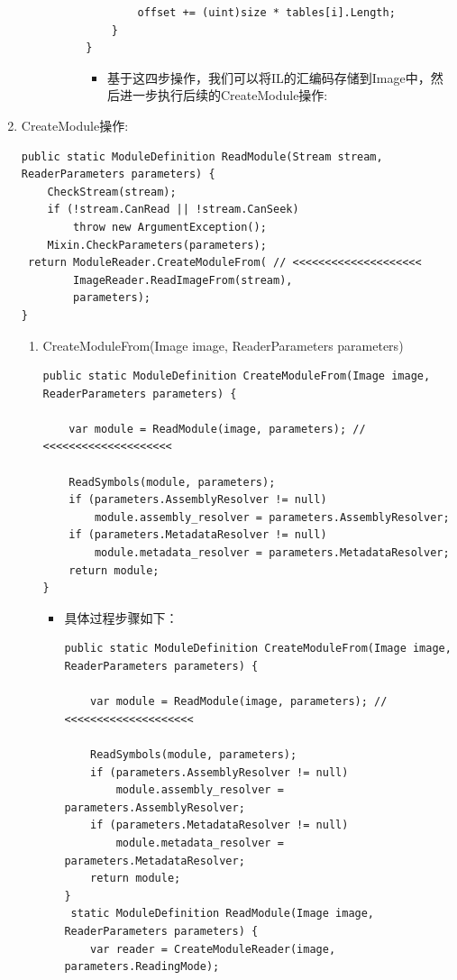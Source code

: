 \documentclass[9pt, b5paper]{article}
\begin{document}
\begin{enumerate}
\begin{enumerate}
\begin{enumerate}
\begin{enumerate}
\begin{verbatim}
        offset += (uint)size * tables[i].Length;
    }
}
\end{verbatim}
\begin{itemize}
\item 基于这四步操作，我们可以将IL的汇编码存储到Image中，然后进一步执行后续的CreateModule操作:
\end{itemize}
\end{enumerate}
\end{enumerate}
\end{enumerate}
\item CreateModule操作:
\label{sec-9-1-3-2}
\begin{verbatim}
public static ModuleDefinition ReadModule(Stream stream, ReaderParameters parameters) {
    CheckStream(stream);
    if (!stream.CanRead || !stream.CanSeek)
        throw new ArgumentException();
    Mixin.CheckParameters(parameters);
 return ModuleReader.CreateModuleFrom( // <<<<<<<<<<<<<<<<<<<<  
        ImageReader.ReadImageFrom(stream),
        parameters);
}
\end{verbatim}
\begin{enumerate}
\item CreateModuleFrom(Image image, ReaderParameters parameters)
\label{sec-9-1-3-2-1}
\begin{verbatim}
public static ModuleDefinition CreateModuleFrom(Image image, ReaderParameters parameters) {

    var module = ReadModule(image, parameters); // <<<<<<<<<<<<<<<<<<<< 

    ReadSymbols(module, parameters);
    if (parameters.AssemblyResolver != null)
        module.assembly_resolver = parameters.AssemblyResolver;
    if (parameters.MetadataResolver != null)
        module.metadata_resolver = parameters.MetadataResolver;
    return module;
}
\end{verbatim}
\begin{itemize}
\item 具体过程步骤如下：
\begin{verbatim}
public static ModuleDefinition CreateModuleFrom(Image image, ReaderParameters parameters) {

    var module = ReadModule(image, parameters); // <<<<<<<<<<<<<<<<<<<< 

    ReadSymbols(module, parameters);
    if (parameters.AssemblyResolver != null)
        module.assembly_resolver = parameters.AssemblyResolver;
    if (parameters.MetadataResolver != null)
        module.metadata_resolver = parameters.MetadataResolver;
    return module;
}
 static ModuleDefinition ReadModule(Image image, ReaderParameters parameters) {
    var reader = CreateModuleReader(image, parameters.ReadingMode);


\end{verbatim}
\end{itemize}
\end{enumerate}
\end{enumerate}
\end{document}
